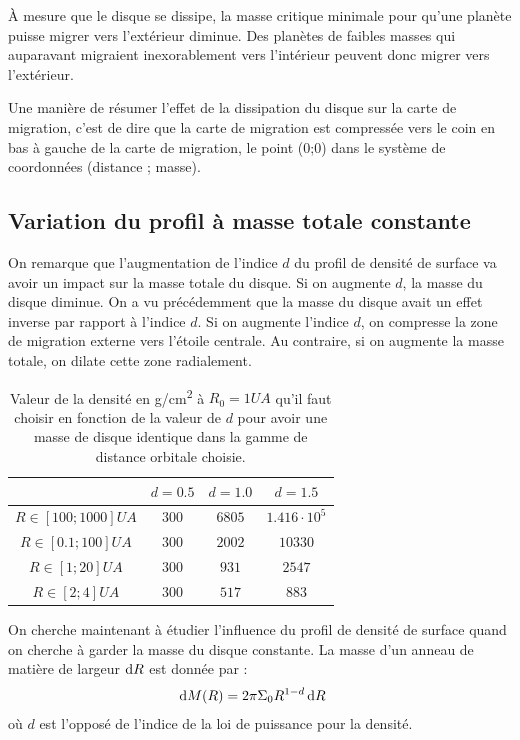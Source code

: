 À mesure que le disque se dissipe, la masse critique minimale pour qu'une planète puisse migrer vers l'extérieur diminue. Des planètes de faibles masses qui auparavant migraient inexorablement vers l'intérieur peuvent donc migrer vers l'extérieur. 

Une manière de résumer l'effet de la dissipation du disque sur la carte de migration, c'est de dire que la carte de migration
est compressée vers le coin en bas à gauche de la carte de migration, le point (0;0) dans le système de coordonnées (distance ;
masse).

\subsection{Variation du profil à masse totale constante}
On remarque que l'augmentation de l'indice $d$ du profil de densité de surface va avoir un impact sur la masse totale du
disque. Si on augmente $d$, la masse du disque diminue. On a vu précédemment que la masse du disque avait un effet inverse par rapport à l'indice $d$. Si on augmente
l'indice $d$, on compresse la zone de migration externe vers l'étoile centrale. Au contraire, si on augmente la masse totale, on
dilate cette zone radialement. 

\begin{table}[htbp]
\centering
\begin{tabular}{|c|c|c|c|}
\hline 
 & $d=0.5$ & $d=1.0$ & $d=1.5$ \\\hline 
$R\in[100 ; 1000]\unit{UA}$ & $300$ & $6805$ & $1.416\cdot 10^5$ \\ \hline 
$R\in[0.1 ; 100]\unit{UA}$ & $300$ & $2002$ & $10330$ \\ \hline 
$R\in[1 ; 20]\unit{UA}$ & $300$ & $931$ & $2547$ \\ \hline 
$R\in[2 ; 4]\unit{UA}$ & $300$ & $517$ & $883$ \\ \hline 
\end{tabular} 
\caption[Différents profils de disque ayant la même masse totale.]{Valeur de la densité en \unit{g/cm^2} à $R_0=1\unit{UA}$
qu'il faut choisir en fonction de la valeur de $d$ pour avoir une masse de disque identique dans la gamme de distance orbitale
choisie.}\label{tab:profils_equivalents}
\end{table}

On cherche maintenant à étudier l'influence du profil de densité de surface quand on cherche à garder la masse du disque constante. La masse d'un anneau de matière de largeur $\operatorname{d \!} R$ est donnée par : 
\begin{align}
\operatorname{d \!} M(R) &= 2\pi \Sigma_0 R^{1-d} \operatorname{d \!} R
\end{align}
où $d$ est l'opposé de l'indice de la loi de puissance pour la densité. 

